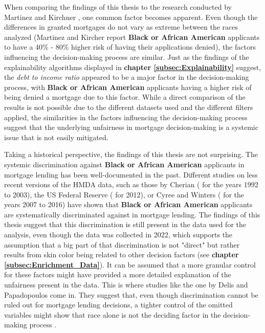 When comparing the findings of this thesis to the research conducted by Martinez and Kirchner \parencite{Martinez2021}, one common factor becomes apparent. Even though the differences in granted mortgages do not vary as extreme between the races analyzed (Martinez and Kircher report \textbf{Black or African American} applicants to have a 40\% - 80\% higher risk of having their applications denied), the factors influencing the decision-making process are similar.
Just as the findings of the explainability algorithms displayed in \textbf{chapter \ref{subsec:Explainability}} suggest, the \textit{debt to income ratio} appeared to be a major factor in the decision-making process, with \textbf{Black or African American} applicants having a higher risk of being denied a mortgage due to this factor.
While a direct comparison of the results is not possible due to the different datasets used and the different filters applied, the similarities in the factors influencing the decision-making process suggest that the underlying unfairness in mortgage decision-making is a systemic issue that is not easily mitigated.

Taking a historical perspective, the findings of this thesis are not surprising. The systemic discrimination against \textbf{Black or African American} applicants in mortgage lending has been well-documented in the past. 
Different studies on less recent versions of the HMDA data, such as those by Cherian (\cite{Cherian2014} for the years 1992 to 2003), the US Federal Reserve (\cite{Fed2013} for 2012), or Cyree and Winters (\cite{Cyree2023} for the years 2007 to 2016) have shown that \textbf{Black or African American} applicants are systematically discriminated against in mortgage lending.
The findings of this thesis suggest that this discrimination is still present in the data used for the analysis, even though the data was collected in 2022, which supports the assumption that a big part of that discrimination is not "direct" but rather results from skin color being related to other decision factors (see \textbf{chapter \ref{subsec:Enrichment_Data}}).
It can be assumed that a more granular control for these factors might have provided a more detailed explanation of the unfairness present in the data. This is where studies like the one by Delis and Papadopoulos come in. They suggest that, even though discrimination cannot be ruled out for mortgage lending decisions, a tighter control of the omitted variables might show that race alone is not the deciding factor in the decision-making process \parencite{Delis2019}.

